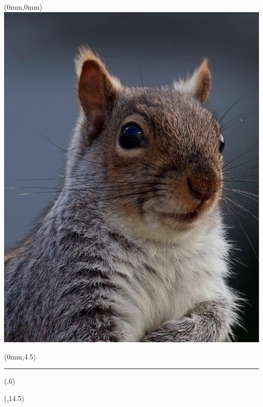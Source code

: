 \begin{textblock*}{\paperwidth}(0mm,0mm)
  \includegraphics[width=\paperwidth,%
                   keepaspectratio=true]{images/Sciurus_carolinensis}
\end{textblock*}

\begin{textblock*}{\paperwidth}(0mm,4.5\TPVertModule)
  \textcolor{black!10}{\rule{\paperwidth}{13\TPVertModule}}
\end{textblock*}
\begin{textblock*}{0.75\textwidth}(\TPHorizModule,6\TPVertModule)
  \titlefmt
\end{textblock*}

\begin{textblock*}{0.75\textwidth}(\TPHorizModule,14.5\TPVertModule)
  \authorsfmt
\end{textblock*}

\null\cleardoublepage


